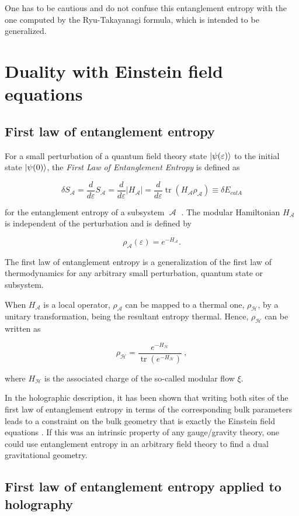 \documentclass[twocolumn]{revtex4}
\providecommand{\abs}[1]{\lvert#1\rvert}
\providecommand{\eq}[2]{
    \begin{equation}
        #2
    \label{eq:#1}
    \end{equation}
}
\DeclareMathOperator{\calA}{\mathcal{A}}
\DeclareMathOperator{\calH}{\mathcal{H}}
\DeclareMathOperator{\tr}{tr}
\begin{document}
One has to be cautious and do not confuse this entanglement entropy with the one computed by the Ryu-Takayanagi formula, which is intended to be generalized.








\section{Duality with Einstein field equations} \label{s:EQ}

\subsection{First law of entanglement entropy} \label{ss:FLEE}

For a small perturbation of a quantum field theory state $\ket{\psi(\varepsilon)}$ to the initial state $\ket{\psi(0)}$, the \textit{First Law of Entanglement Entropy} is defined as
\eq{FLEE}{
    \delta S_{\calA} = \frac{d}{d \varepsilon} S_{\calA} = \frac{d}{d \varepsilon} \abs{H_{\calA}} = \frac{d}{d \varepsilon} \tr (H_{\calA} \rho_{\calA}) \equiv \delta E_{calA}
}
for the entanglement entropy of a subsystem $\calA$ \cite{fareghbal_first_2019}. The modular Hamiltonian $H_{\calA}$ is independent of the perturbation and is defined by
\eq{modularH}{
    \rho_{\calA} (\varepsilon) = e^{-H_{\calA}}.
}

The first law of entanglement entropy is a generalization of the first law of thermodynamics for any arbitrary small perturbation, quantum state or subsystem.

When $H_{\calA}$ is a local operator, $\rho_{\calA}$ can be mapped to a thermal one, $\rho_{\calH}$, by a unitary transformation, being the resultant entropy thermal. Hence, $\rho_{\calH}$ can be written as
\eq{modularH2}{
    \rho_{\calH} = \frac{e^{-H_{\calH}}}{\tr (e^{-H_{\calH}})} \ ,
}
where $H_{\calH}$ is the associated charge of the so-called modular flow $\xi$.

In the holographic description, it has been shown that writing both sites of the first law of entanglement entropy in terms of the corresponding bulk parameters leads to a constraint on the bulk geometry that is exactly the Einstein field equations \cite{fareghbal_first_2019}. If this was an intrinsic property of any gauge/gravity theory, one could use entanglement entropy in an arbitrary field theory to find a dual gravitational geometry.

\subsection{First law of entanglement entropy applied to holography} \label{ss:FLEE_H}
\end{document}
